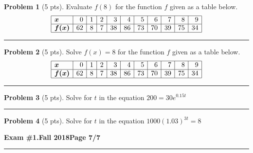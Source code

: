 \documentclass[12pt]{article}
\theoremstyle{definition}
\newtheorem{problem}{Problem}
\begin{document}
\begin{problem}[5 pts]
  Evaluate $f(8)$ for the function $f$ given as a table below.
  \begin{equation*}
    \begin{array}{|l|r|r|r|r|r|r|r|r|r|r|}
      \hline
      \boldsymbol{x} & 0 & 1 & 2 & 3 & 4 & 5 & 6 & 7 & 8 & 9 \\ \hline
      \boldsymbol{f(x)} & 62 & 8 & 7 & 38 & 86 & 73 & 70 & 39 & 75 & 34 \\ \hline
    \end{array}
  \end{equation*}

  \vspace{1cm}
\end{problem}
\hrule

\begin{problem}[5 pts]
  Solve $f(x)=8$ for the function $f$ given as a table below.
  \begin{equation*}
    \begin{array}{|l|r|r|r|r|r|r|r|r|r|r|}
      \hline
      \boldsymbol{x} & 0 & 1 & 2 & 3 & 4 & 5 & 6 & 7 & 8 & 9 \\ \hline
      \boldsymbol{f(x)} & 62 & 8 & 7 & 38 & 86 & 73 & 70 & 39 & 75 & 34 \\ \hline
    \end{array}
  \end{equation*}

  \vspace{1cm}
\end{problem}
\hrule

\begin{problem}[5 pts]
  Solve for $t$ in the equation $200 = 30e^{0.15t}$

  \vspace{4cm}
\end{problem}
\hrule

\begin{problem}[5 pts]
  Solve for $t$ in the equation $1000( 1.03)^{3t}=8$

\end{problem}

\newpage 


\hfill{\large\bf Exam \#1.}\hfill{\large\bf  Fall 2018}\hfill{\large\bf Page 7/7}\hrule

\bigskip
\end{document}
